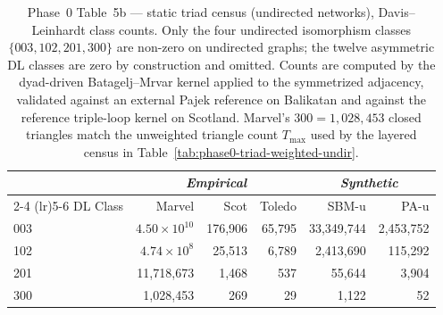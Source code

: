 \documentclass[11pt]{article}
\begin{document}
\begin{table}[!htbp]
\centering
\footnotesize
\setlength{\tabcolsep}{4pt}
\begin{tabular}{l r r r | r r}
\toprule
& \multicolumn{3}{c|}{\textit{Empirical}} & \multicolumn{2}{c}{\textit{Synthetic}} \\
\cmidrule(lr){2-4} \cmidrule(lr){5-6}
DL Class & Marvel & Scot & Toledo & SBM-u & PA-u \\
\midrule
003   & $4.50\times10^{10}$ & 176{,}906 & 65{,}795 & 33{,}349{,}744 & 2{,}453{,}752 \\
102   & $4.74\times10^{8}$ & 25{,}513 & 6{,}789 & 2{,}413{,}690 & 115{,}292 \\
201   & 11{,}718{,}673 & 1{,}468 & 537 & 55{,}644 & 3{,}904 \\
300   & 1{,}028{,}453 & 269 & 29 & 1{,}122 & 52 \\
\bottomrule
\end{tabular}
\caption{Phase~0 Table~5b --- static triad census (undirected networks), Davis--Leinhardt class counts. Only the four undirected isomorphism classes $\{003, 102, 201, 300\}$ are non-zero on undirected graphs; the twelve asymmetric DL classes are zero by construction and omitted. Counts are computed by the dyad-driven Batagelj--Mrvar kernel applied to the symmetrized adjacency, validated against an external Pajek reference on Balikatan and against the reference triple-loop kernel on Scotland. Marvel's $300 = 1{,}028{,}453$ closed triangles match the unweighted triangle count $T_{\max}$ used by the layered census in Table~\ref{tab:phase0-triad-weighted-undir}.}
\label{tab:phase0-triad-static-undir}
\end{table}
\end{document}
